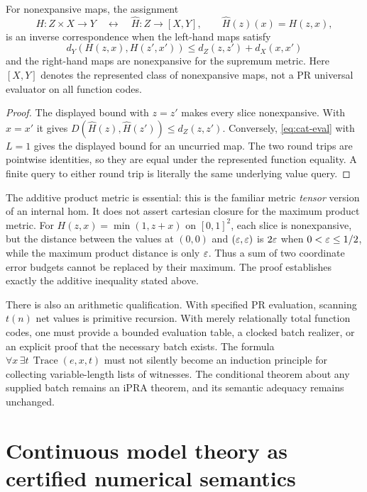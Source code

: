 \begin{theorem}
\label{thm:cat-currying}
For nonexpansive maps, the assignment
\[
 H:Z\times X\longrightarrow Y
 \quad\longleftrightarrow\quad
 \widehat H:Z\longrightarrow [X,Y],
 \qquad \widehat H(z)(x)=H(z,x),
\]
is an inverse correspondence when the left-hand maps satisfy
\[
 d_Y(H(z,x),H(z',x'))\leq d_Z(z,z')+d_X(x,x')
\]
and the right-hand maps are nonexpansive for the supremum metric.
Here $[X,Y]$ denotes the represented class of nonexpansive maps, not a PR
universal evaluator on all function codes.
\end{theorem}

\begin{proof}
The displayed bound with $z=z'$ makes every slice nonexpansive. With $x=x'$
it gives $D(\widehat H(z),\widehat H(z'))\leq d_Z(z,z')$. Conversely,
\eqref{eq:cat-eval} with $L=1$ gives the displayed bound for an uncurried
map. The two round trips are pointwise identities, so they are equal under
the represented function equality. A finite query to either round trip is
literally the same underlying value query.
\end{proof}

The additive product metric is essential: this is the familiar metric
\emph{tensor} version of an internal hom. It does not assert cartesian closure
for the maximum product metric. For $H(z,x)=\min(1,z+x)$ on $[0,1]^2$, each slice is nonexpansive,
but the distance between the values at $(0,0)$ and $(\varepsilon,\varepsilon)$ is
$2\varepsilon$ when $0<\varepsilon\leq1/2$, while the maximum product distance is
only $\varepsilon$. Thus a sum of two coordinate error budgets cannot be
replaced by their maximum. The proof
establishes exactly the additive inequality stated above.

There is also an arithmetic qualification. With specified PR evaluation,
scanning $t(n)$ net values is primitive recursion. With merely relationally
total function codes, one must provide a bounded evaluation table, a clocked
batch realizer, or an explicit proof that the necessary batch exists.
The formula $\forall x\,\exists t\,\operatorname{Trace}(e,x,t)$ must not
silently become an induction principle for collecting variable-length lists
of witnesses. The conditional theorem about any supplied batch remains an
iPRA theorem, and its semantic adequacy remains unchanged.

\section{Continuous model theory as certified numerical semantics}
\label{sec:continuous-models}

